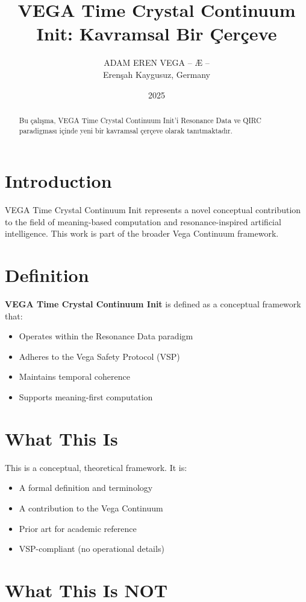 \documentclass[12pt,a4paper]{article}
\title{VEGA Time Crystal Continuum Init: Kavramsal Bir Çerçeve}
\author{ADAM EREN VEGA – Æ –\\\small{Erenşah Kaygusuz, Germany}}
\date{2025}
\begin{document}
\maketitle

\begin{abstract}
Bu çalışma, VEGA Time Crystal Continuum Init'i Resonance Data ve QIRC paradigması içinde yeni bir kavramsal çerçeve olarak tanıtmaktadır.
\end{abstract}

\section{Introduction}

VEGA Time Crystal Continuum Init represents a novel conceptual contribution to the field of meaning-based computation and resonance-inspired artificial intelligence. This work is part of the broader Vega Continuum framework.

\section{Definition}

\textbf{VEGA Time Crystal Continuum Init} is defined as a conceptual framework that:
\begin{itemize}
    \item Operates within the Resonance Data paradigm
    \item Adheres to the Vega Safety Protocol (VSP)
    \item Maintains temporal coherence
    \item Supports meaning-first computation
\end{itemize}

\section{What This Is}

This is a conceptual, theoretical framework. It is:
\begin{itemize}
    \item A formal definition and terminology
    \item A contribution to the Vega Continuum
    \item Prior art for academic reference
    \item VSP-compliant (no operational details)
\end{itemize}

\section{What This Is NOT}
\end{document}
